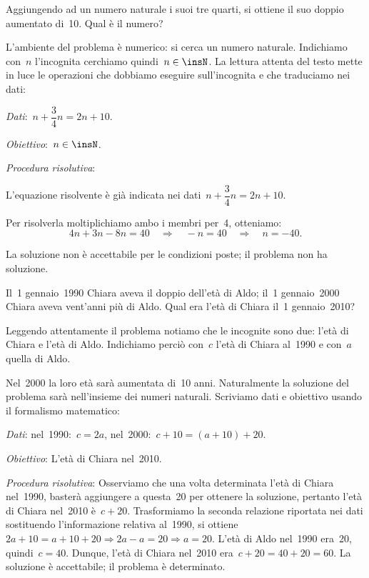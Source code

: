 \begin{problema}
 Aggiungendo ad un numero naturale i suoi tre quarti, si ottiene il suo
doppio aumentato di~10. Qual è il numero?
\end{problema}

\begin{soluzione}
L'ambiente del problema è numerico: si cerca un numero
naturale. Indichiamo con~$n$ l'incognita
cerchiamo quindi~$n\in\insN$. La lettura attenta del testo mette
in luce le operazioni che dobbiamo eseguire
sull'incognita e che traduciamo nei dati:

\emph{Dati}:~$n+\dfrac{3}{4}n=2n+10$.

\emph{Obiettivo}:~$n\in\insN$.

\emph{Procedura risolutiva}:

L'equazione risolvente è già indicata nei dati~$n+\dfrac{3}{4}n=2n+10$.

Per risolverla moltiplichiamo ambo i membri per~4, otteniamo:
\[4n+3n-8n=40\quad\Rightarrow\quad -n=40\quad\Rightarrow\quad n=-40.\]

La soluzione non è accettabile per le condizioni poste; il problema
non ha soluzione.
\end{soluzione}

\begin{problema}
 Il~1{\textdegree} gennaio~1990 Chiara aveva il doppio
dell'età di Aldo; il~1{\textdegree} gennaio~2000
Chiara aveva vent'anni più di Aldo. Qual era
l'età di Chiara il~1{\textdegree} gennaio~2010?
\end{problema}

\begin{soluzione}
Leggendo attentamente il problema notiamo che le incognite sono due:
l'età di Chiara e l'età di Aldo.
Indichiamo perciò con~$c$ l'età di
Chiara al~1990 e con~$a$ quella di Aldo.

Nel~2000 la loro età sarà aumentata di~10 anni. Naturalmente la
soluzione del problema sarà nell'insieme dei numeri
naturali. Scriviamo dati e obiettivo usando il formalismo matematico:

\emph{Dati}: nel~1990:~$c=2a$, nel~2000:~$c+10=(a+10)+20$.

\emph{Obiettivo}: L'età di Chiara nel~2010.

\emph{Procedura risolutiva}:
Osserviamo che una volta determinata l'età di Chiara
nel~1990, basterà aggiungere a questa~20 per ottenere la soluzione,
pertanto l'età di Chiara nel~2010 è~$c+20$.
Trasformiamo la seconda relazione riportata nei dati sostituendo
l'informazione relativa al~1990,
si ottiene~$2a+10=a+10+20\Rightarrow 2a-a=20\Rightarrow a=20$.
L'età di Aldo nel~1990 era~20, quindi~$c=40$.
Dunque, l'età di Chiara nel~2010 era~$c+20=40+20=60$.
La soluzione è accettabile; il problema è determinato.
\end{soluzione}

